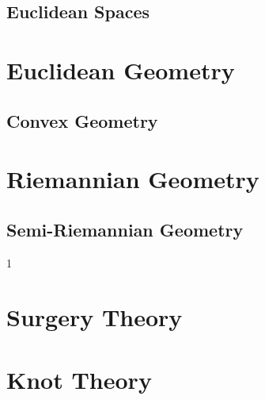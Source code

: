 \documentclass{book}                                                           %
\def\compilegeotop{0}
\begin{document}
                \chapter{Euclidean Spaces}
                    \renewcommand{\PATH}{\PARPATH/Euclidean_Spaces}
                    \label{chapt:Euclidean_Spaces}%
                    
            \part{Euclidean Geometry}
                \renewcommand{\PARPATH}{\TOPPATH/Geometry/Euclidean_Geometry}
                \chapter{Convex Geometry}
                    \renewcommand{\PATH}{\PARPATH/Convex_Geometry}
                    \label{chapt:Euclidean_Spaces}%
                    
            \part{Riemannian Geometry}
                \renewcommand{\PARPATH}{\TOPPATH/Geometry/Riemannian_Geometry}
                \chapter{Semi-Riemannian Geometry}
                    \renewcommand{\PATH}{\PARPATH/Semi_Riemannian_Geometry}
                    \label{chapt:Semi_Riemannian}%
                    
        \clearpage
        \setcounter{endpage}{\thepage}
    \fi

    \if\compilegeotop1
            \label{book:Geometric_Topology}%
            \renewcommand{\PATH}{\TOPPATH/Geometric_Topology}
            \setcounter{page}{\value{endpage}}
            \part{Surgery Theory}
                
            \part{Knot Theory}
                
        \clearpage
        \setcounter{endpage}{\thepage}
    \fi
\end{document}
